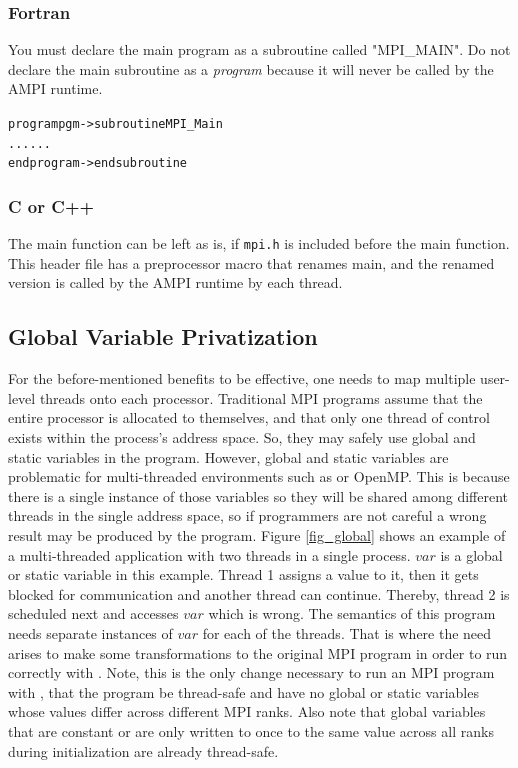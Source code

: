 \documentclass[10pt]{article}
\begin{document}
\subsubsection{Fortran}

You must declare the main program as a subroutine called "MPI\_MAIN". 
Do not declare the main subroutine as a \textit{program} because 
it will never be called by the AMPI runtime.

\begin{alltt}

program pgm -> subroutine MPI_Main
	...		    		      ...
end program -> end subroutine
\end{alltt}

\subsubsection{C or C++}

The main function can be left as is, if \texttt{mpi.h} is included before the main function. 
This header file has a preprocessor macro that renames main, and 
the renamed version is called by the AMPI runtime by each thread.


\subsection{Global Variable Privatization}

For the before-mentioned benefits to be effective, one needs to map multiple
user-level threads onto each processor. Traditional MPI programs assume that the
entire processor is allocated to themselves, and that only one thread of
control exists within the process's address space. So, they may safely use global and
static variables in the program. However, global and static variables are
problematic for multi-threaded environments such as \ampi{} or OpenMP.
This is because there is a single instance of those variables so they will be 
shared among different threads in the single address space, so if programmers are not careful
a wrong result may be produced by the program.
Figure \ref{fig_global} shows an example of a multi-threaded application with 
two threads in a single process. $var$ is a global or static variable in this 
example. Thread 1 assigns a value to it, then it gets blocked for communication 
and another thread can continue. Thereby, thread 2 is scheduled next and 
accesses $var$ which is wrong. The semantics of this program needs separate
instances of $var$ for each of the threads. That is where the need arises
to make some transformations to the original MPI program in order to run
correctly with \ampi{}. Note, this is the only change necessary to run an MPI 
program with \ampi{}, that the program be thread-safe and have no global or static
variables whose values differ across different MPI ranks. Also note that global variables
that are constant or are only written to once to the same value across all ranks
during initialization are already thread-safe.
\end{document}

